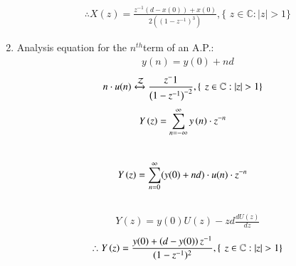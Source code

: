\documentclass[journal,12pt,twocolumn]{IEEEtran}
\theoremstyle{remark}
\begin{document}
\begin{enumerate}
\begin{align}
 \therefore  X(z)=\frac{z^{-1}(d-x(0))+x(0)}{2(({1-z^{-1}})^{3})} ,\{\hspace{4pt} {z\in\mathbb{C} : \lvert z \rvert >1\}} \end{align}
\item 
Analysis equation for the $n^{th}$term of an A.P.:\\
\begin{align}
    y(n)=y(0)+nd
\end{align}
\begin{align}
    n\cdot u(n)&\xleftrightarrow{\mathcal{Z}}\frac{z^-1}{\left({1-z^{-1}}\right)^{-2}}, {\{\hspace{4pt} {z\in\mathbb{C} : \lvert z \rvert >1}\}}
\end{align}
\begin{align} Y\left(z\right) &= \sum_{n=-\infty}^\infty y\left(n\right)\cdot z^{-n}\end{align} \\
\begin{align} Y\left(z\right) &= \sum_{n=0}^\infty (y(0)+nd)\cdot{u(n)}\cdot z^{-n}\end{align} \\
\begin{align}
    Y(z)=y(0)U(z)-zd\frac{dU(z)}{dz}
\end{align}
\begin{align}
   \therefore Y\left(z\right)= \frac{y(0)+\left(d-y(0)\right)z^{-1}}{(1-z^{-1})^{2}}, \{\hspace{4pt} {z\in\mathbb{C} : \lvert z \rvert >1\}}
\end{align}
 \end{enumerate}




\renewcommand{\thefigure}{\theenumi}
\renewcommand{\thetable}{\theenumi}
\end{document}

